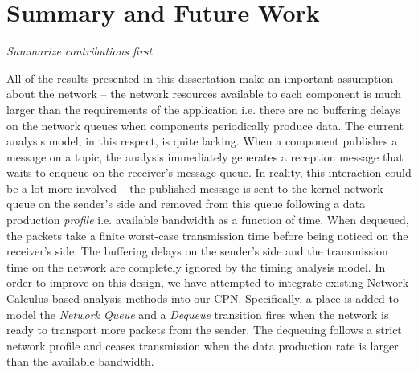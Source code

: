 \chapter{Summary and Future Work}

\emph{Summarize contributions first}

All of the results presented in this dissertation make an important assumption about the network -- the network resources available to each component is much larger than the requirements of the application i.e. there are no buffering delays on the network queues when components periodically produce data. The current analysis model, in this respect, is quite lacking. When a component publishes a message on a topic, the analysis immediately generates a reception message that waits to enqueue on the receiver's message queue. In reality, this interaction could be a lot more involved -- the published message is sent to the kernel network queue on the sender's side and removed from this queue following a data production \emph{profile} i.e. available bandwidth as a function of time. When dequeued, the packets take a finite worst-case transmission time before being noticed on the receiver's side. The buffering delays on the sender's side and the transmission time on the network are completely ignored by the timing analysis model. In order to improve on this design, we have attempted to integrate existing Network Calculus-based analysis methods \cite{ISIS_F6_CYPHY:14} into our CPN. Specifically, a place is added to model the \emph{Network Queue} and a \emph{Dequeue} transition fires when the network is ready to transport more packets from the sender. The dequeuing follows a strict network profile and ceases transmission when the data production rate is larger than the available bandwidth. 

